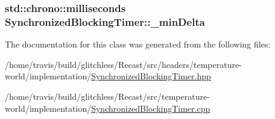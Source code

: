 \hypertarget{class_synchronized_blocking_timer_a61a45cf02dfe6a18392f493459d98790}{
\subsubsection[{\-\_\-min\-Delta}]{\setlength{\rightskip}{0pt plus 5cm}std\-::chrono\-::milliseconds Synchronized\-Blocking\-Timer\-::\-\_\-min\-Delta\hspace{0.3cm}{\ttfamily [protected]}}}\label{class_synchronized_blocking_timer_a61a45cf02dfe6a18392f493459d98790}


The documentation for this class was generated from the following files\-:\begin{DoxyCompactItemize}
\item 
/home/travis/build/glitchless/\-Recast/src/headers/temperature-\/world/implementation/\hyperlink{_synchronized_blocking_timer_8hpp}{Synchronized\-Blocking\-Timer.\-hpp}\item 
/home/travis/build/glitchless/\-Recast/src/temperature-\/world/implementation/\hyperlink{_synchronized_blocking_timer_8cpp}{Synchronized\-Blocking\-Timer.\-cpp}\end{DoxyCompactItemize}
